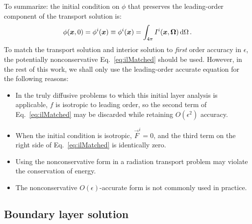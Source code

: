 To summarize: the initial condition on $\phi$ that preserves the leading-order
component of the transport solution is:
\begin{equation*}
  \phi(\bm{x},0) = \phi^i(\bm{x}) \equiv 
  \phi^i(\bm{x}) = \int_{4\pi} I^i(\bm{x},\bm{\Omega}) \mathop{}\!\mathrm{d}\Omega\,.
\end{equation*}
To match the transport solution and interior solution to \emph{first} order
accuracy in $\epsilon$, the potentially nonconservative
Eq.~\eqref{eq:ilMatched} should be used. However, in the rest of this work, we
shall only use the leading-order accurate equation for the following reasons:
\begin{itemize}
  \item In the truly diffusive problems to which this initial layer analysis is
    applicable, $f$ is isotropic to leading order, so the second term of
    Eq.~\eqref{eq:ilMatched} may be discarded while retaining $O(\epsilon^2)$
    accuracy.
  \item When the initial condition is isotropic, $\vec{F}^i=0$, and the third
    term on the right side of Eq.~\eqref{eq:ilMatched} is identically zero.
  \item Using the nonconservative form in a radiation transport problem may
    violate the conservation of energy.
  \item The nonconservative $O(\epsilon)$-accurate form is not commonly used in
    practice.
\end{itemize}

\subsection{Boundary layer solution}\label{sec:adBoundary}

